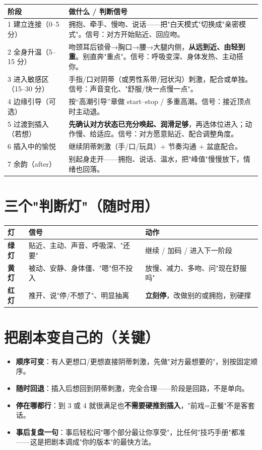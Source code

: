 \begin{tabularx}{\textwidth}{l X}
\toprule
\textbf{阶段} & \textbf{做什么 / 判断信号} \\
\midrule
1 建立连接（0--5 分） & 拥抱、牵手、慢吻、说话——把"白天模式"切换成"亲密模式"。信号：对方开始贴近、回应吻。 \\
2 全身升温（5--15 分） & 吻颈耳后锁骨→胸口→腰→大腿内侧，\textbf{从远到近、由轻到重}。别直奔"重点"。信号：呼吸变深、身体发热、主动搭你。 \\
3 进入敏感区（15--30 分） & 手指/口对阴蒂（或男性系带/冠状沟）刺激，配合或单独。信号：声音变化、"舒服/快一点慢一点"。 \\
4 边缘引导（可选） & 按“高潮引导”章做 start--stop / 多重高潮。信号：接近顶点时主动退。 \\
5 过渡到插入（若想） & \textbf{先确认对方状态已充分唤起、润滑足够}，再选体位进入；动作慢、给适应。信号：对方愿意贴近、配合调整角度。 \\
6 插入中的愉悦 & 继续阴蒂刺激（手/口/玩具）+ 节奏沟通 + 盆底配合。 \\
7 余韵（after） & 别起身走开——拥抱、说话、温水，把"峰值"慢慢放下，情绪也回落。 \\
\bottomrule
\end{tabularx}

\section{三个"判断灯"（随时用）}
\begin{tabularx}{\textwidth}{l X X}
\toprule
\textbf{灯} & \textbf{信号} & \textbf{动作} \\
\midrule
\textbf{绿灯} & 贴近、主动、声音、呼吸深、"还要" & 继续 / 加码 / 进入下一阶段 \\
\textbf{黄灯} & 被动、安静、身体僵、"嗯"但不投入 & 放慢、减力、多吻、问"现在舒服吗" \\
\textbf{红灯} & 推开、说"停/不想了"、明显抽离 & \textbf{立刻停}，改做别的或拥抱，别硬撑 \\
\bottomrule
\end{tabularx}

\section{把剧本变自己的（关键）}
\begin{itemize}[leftmargin=2em,itemsep=0.3em]
  \item \textbf{顺序可变}：有人更想口/更想直接阴蒂刺激，先做"对方最想要的"，别按固定顺序。
  \item \textbf{随时回退}：插入后想回到阴蒂刺激，完全合理——阶段是回路，不是单向。
  \item \textbf{停在哪都行}：到 3 或 4 就很满足也\textbf{不需要硬推到插入}，"前戏=正餐"不是客套话。
  \item \textbf{事后复盘一句}：事后轻松问"哪个部分最让你享受"，比任何"技巧手册"都准——这是把剧本调成"你的版本"的最快方法。
\end{itemize}


